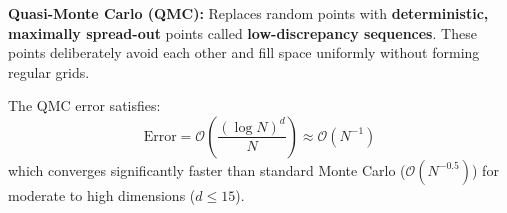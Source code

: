 \begin{definition}
    \textbf{Quasi-Monte Carlo (QMC):} Replaces random points with \textbf{deterministic, maximally spread-out} points called \textbf{low-discrepancy sequences}. These points deliberately avoid each other and fill space uniformly without forming regular grids.
\end{definition}

\begin{remark}
    The QMC error satisfies:
    $$\text{Error} = \mathcal{O}\left(\frac{(\log N)^d}{N}\right) \approx \mathcal{O}(N^{-1})$$
    which converges significantly faster than standard Monte Carlo ($\mathcal{O}(N^{-0.5})$) for moderate to high dimensions ($d \le 15$).
\end{remark}